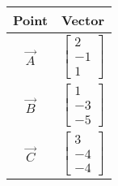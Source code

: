 \begin{center}
\begin{tabular}{|c|c|}
\hline
Point & Vector \\
\hline
$\vec{A}$ & $\begin{bmatrix} 2 \\ -1 \\ 1 \end{bmatrix}$ \\
\hline
$\vec{B}$ & $\begin{bmatrix} 1 \\ -3 \\ -5 \end{bmatrix}$ \\
\hline
$\vec{C}$ & $\begin{bmatrix} 3 \\ -4 \\ -4 \end{bmatrix}$ \\
\hline
\end{tabular}
\end{center}